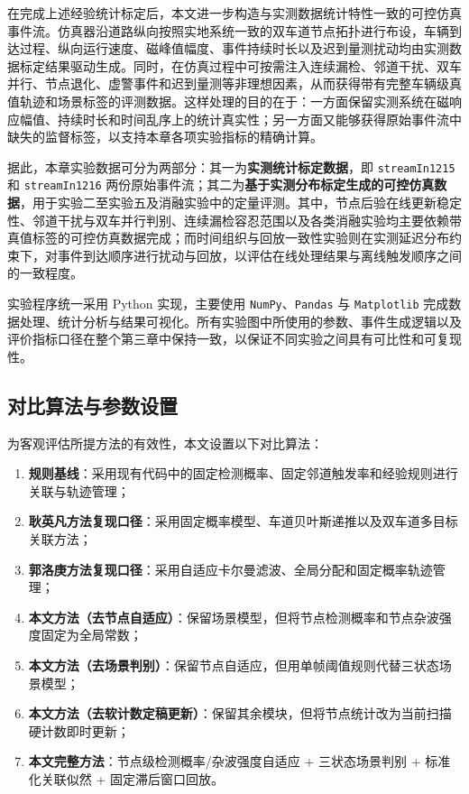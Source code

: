 \documentclass{xdupgthesis}
\begin{document}
在完成上述经验统计标定后，本文进一步构造与实测数据统计特性一致的可控仿真事件流。仿真器沿道路纵向按照实地系统一致的双车道节点拓扑进行布设，车辆到达过程、纵向运行速度、磁峰值幅度、事件持续时长以及迟到量测扰动均由实测数据标定结果驱动生成。同时，在仿真过程中可按需注入连续漏检、邻道干扰、双车并行、节点退化、虚警事件和迟到量测等非理想因素，从而获得带有完整车辆级真值轨迹和场景标签的评测数据。这样处理的目的在于：一方面保留实测系统在磁响应幅值、持续时长和时间乱序上的统计真实性；另一方面又能够获得原始事件流中缺失的监督标签，以支持本章各项实验指标的精确计算。

据此，本章实验数据可分为两部分：其一为\textbf{实测统计标定数据}，即 \texttt{streamIn1215} 和 \texttt{streamIn1216} 两份原始事件流；其二为\textbf{基于实测分布标定生成的可控仿真数据}，用于实验二至实验五及消融实验中的定量评测。其中，节点后验在线更新稳定性、邻道干扰与双车并行判别、连续漏检容忍范围以及各类消融实验均主要依赖带真值标签的可控仿真数据完成；而时间组织与回放一致性实验则在实测延迟分布约束下，对事件到达顺序进行扰动与回放，以评估在线处理结果与离线触发顺序之间的一致程度。

实验程序统一采用 Python 实现，主要使用 \texttt{NumPy}、\texttt{Pandas} 与 \texttt{Matplotlib} 完成数据处理、统计分析与结果可视化。所有实验图中所使用的参数、事件生成逻辑以及评价指标口径在整个第三章中保持一致，以保证不同实验之间具有可比性和可复现性。


\subsection{对比算法与参数设置}

为客观评估所提方法的有效性，本文设置以下对比算法：
\begin{enumerate}
	\item \textbf{规则基线}：采用现有代码中的固定检测概率、固定邻道触发率和经验规则进行关联与轨迹管理；
	\item \textbf{耿英凡方法复现口径}：采用固定概率模型、车道贝叶斯递推以及双车道多目标关联方法；
	\item \textbf{郭洛庚方法复现口径}：采用自适应卡尔曼滤波、全局分配和固定概率轨迹管理；
	\item \textbf{本文方法（去节点自适应）}：保留场景模型，但将节点检测概率和节点杂波强度固定为全局常数；
	\item \textbf{本文方法（去场景判别）}：保留节点自适应，但用单帧阈值规则代替三状态场景模型；
	\item \textbf{本文方法（去软计数定稿更新）}：保留其余模块，但将节点统计改为当前扫描硬计数即时更新；
	\item \textbf{本文完整方法}：节点级检测概率/杂波强度自适应 + 三状态场景判别 + 标准化关联似然 + 固定滞后窗口回放。
\end{enumerate}
\end{document}

